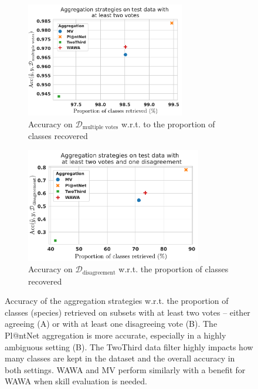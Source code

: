 \begin{figure}[tbh]
    \centering
    \begin{subfigure}[t]{.48\textwidth}
        \centering
        \includegraphics[width=\linewidth, height=5cm]{./images_plantnet/accuracy_by_vol_class_kept_two_votes__micro.pdf}
        \caption{Accuracy on $\mathcal{D}_{\text{multiple votes}}$ w.r.t. to the proportion of classes recovered}
        \label{fig:accuracy_vol_class_multiple}
    \end{subfigure}%
    \hfill
    \begin{subfigure}[t]{.48\textwidth}
        \centering
        \includegraphics[width=\linewidth, height=5cm]{./images_plantnet/accuracy_by_vol_class_kept_one_disagreeement__micro.pdf}
        \caption{Accuracy on $\mathcal{D}_{\text{disagreement}}$ w.r.t. the proportion of classes recovered}
        \label{fig:accuracy_vol_class_disagreeing}
    \end{subfigure}
    \caption{Accuracy of the aggregation strategies w.r.t. the proportion of classes (species) retrieved on subsets with at least two votes -- either agreeing (A) or with at least one disagreeing vote (B). The Pl@ntNet aggregation is more accurate, especially in a highly ambiguous setting (B). The TwoThird data filter highly impacts how many classes are kept in the dataset and the overall accuracy in both settings. WAWA and MV perform similarly with a benefit for WAWA when skill evaluation is needed.}
    \label{fig:accuracy_volume}
\end{figure}

